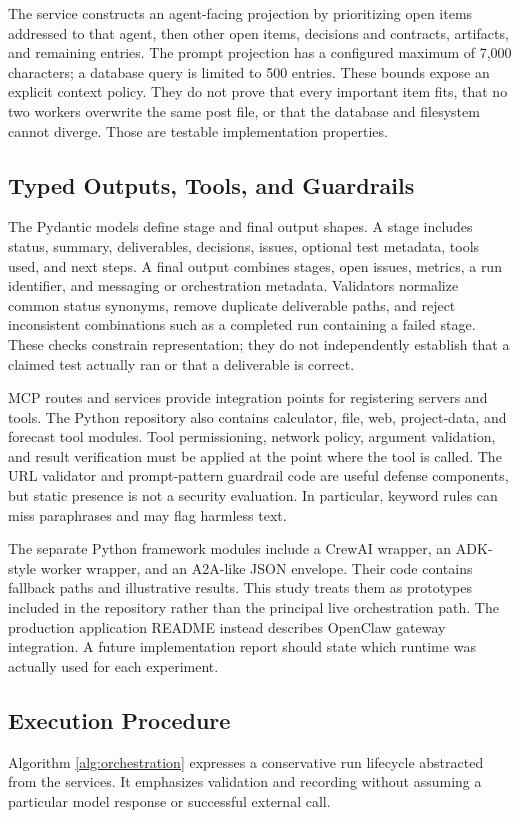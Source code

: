 \documentclass[12pt,onecolumn,draftclsnofoot]{IEEEtran}
\begin{document}
The service constructs an agent-facing projection by prioritizing open items addressed to that agent, then other open items, decisions and contracts, artifacts, and remaining entries. The prompt projection has a configured maximum of 7,000 characters; a database query is limited to 500 entries. These bounds expose an explicit context policy. They do not prove that every important item fits, that no two workers overwrite the same post file, or that the database and filesystem cannot diverge. Those are testable implementation properties.

\subsection{Typed Outputs, Tools, and Guardrails}
The Pydantic models define stage and final output shapes. A stage includes status, summary, deliverables, decisions, issues, optional test metadata, tools used, and next steps. A final output combines stages, open issues, metrics, a run identifier, and messaging or orchestration metadata. Validators normalize common status synonyms, remove duplicate deliverable paths, and reject inconsistent combinations such as a completed run containing a failed stage. These checks constrain representation; they do not independently establish that a claimed test actually ran or that a deliverable is correct.

MCP routes and services provide integration points for registering servers and tools. The Python repository also contains calculator, file, web, project-data, and forecast tool modules. Tool permissioning, network policy, argument validation, and result verification must be applied at the point where the tool is called. The URL validator and prompt-pattern guardrail code are useful defense components, but static presence is not a security evaluation. In particular, keyword rules can miss paraphrases and may flag harmless text.

The separate Python framework modules include a CrewAI wrapper, an ADK-style worker wrapper, and an A2A-like JSON envelope. Their code contains fallback paths and illustrative results. This study treats them as prototypes included in the repository rather than the principal live orchestration path. The production application README instead describes OpenClaw gateway integration. A future implementation report should state which runtime was actually used for each experiment.

\subsection{Execution Procedure}
Algorithm \ref{alg:orchestration} expresses a conservative run lifecycle abstracted from the services. It emphasizes validation and recording without assuming a particular model response or successful external call.
\end{document}
